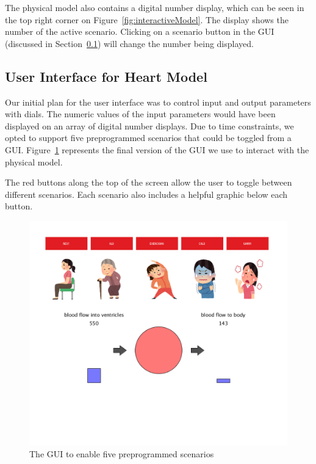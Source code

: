 \documentclass[a4paper, 10pt, american, titlepage]{article}
\begin{document}
The physical model also contains a digital number display, which can be seen in
the top right corner on Figure~\ref{fig:interactiveModel}. The display shows the
number of the active scenario. Clicking on a scenario button in the GUI
(discussed in Section~\ref{sec:userInterfaceForHeartModel}) will change the
number being displayed.

\subsection{User Interface for Heart Model}
\label{sec:userInterfaceForHeartModel}

Our initial plan for the user interface was to control input and output
parameters with dials. The numeric values of the input parameters would have
been displayed on an array of digital number displays. Due to time constraints,
we opted to support five preprogrammed scenarios that could be toggled from a
GUI. Figure~\ref{fig:heartGui} represents the final version of the GUI we use to
interact with the physical model.

The red buttons along the top of the screen allow the user to toggle between
different scenarios. Each scenario also includes a helpful graphic below each
button.

\begin{figure}[h] \centering
    \includegraphics[width=\textwidth]{heart-gui.png}
    \caption{The GUI to enable five preprogrammed scenarios}
    \label{fig:heartGui}
\end{figure}
\end{document}
